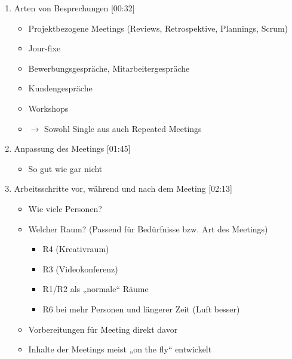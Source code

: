 \begin{enumerate}

    \item Arten von Besprechungen [00:32]
    \begin{itemize}
        \item Projektbezogene Meetings (Reviews, Retrospektive, Plannings, Scrum)
        \item Jour-fixe
        \item Bewerbungsgespräche, Mitarbeitergespräche
        \item Kundengespräche
        \item Workshops
        \item[] $\rightarrow$ Sowohl Single aus auch Repeated Meetings
    \end{itemize}
    
    \item Anpassung des Meetings [01:45]
     \begin{itemize}
        \item So gut wie gar nicht
    \end{itemize}
    
    \item Arbeitsschritte vor, während und nach dem Meeting [02:13]
     \begin{itemize}
        \item Wie viele Personen?
        \item Welcher Raum? (Passend für Bedürfnisse bzw. Art des Meetings)
        \begin{itemize}
            \item R4 (Kreativraum)
            \item R3 (Videokonferenz)
            \item R1/R2 als „normale“ Räume
            \item R6 bei mehr Personen und längerer Zeit (Luft besser)
        \end{itemize}
        \item Vorbereitungen für Meeting direkt davor
        \item Inhalte der Meetings meist „on the fly“ entwickelt
    \end{itemize}
    

\end{enumerate}

